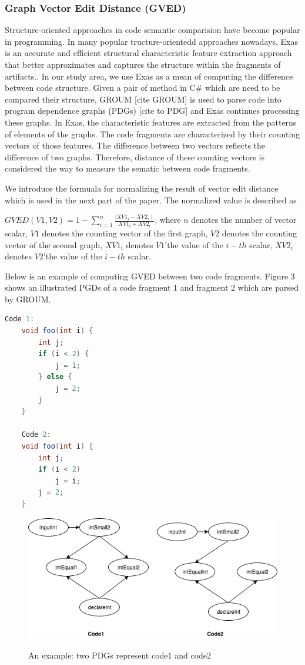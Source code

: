 \subsubsection{\textbf{Graph Vector Edit Distance (GVED)}} 
Structure-oriented approaches in code semantic comparision have become popular in programming. In many popular tructure-orientedd approaches nowadays, Exas is an accurate and efficient structural characteristic feature extraction approach that better approximates and captures the structure within the fragments of artifacts.\cite{Accurate and Efficient Structural Characteristic Feature Extraction for Clone Detection}.
In our study area, we use Exas as a mean of computing the difference between code structure. Given a pair of method in C\# which are need to be compared their structure, GROUM [cite GROUM] is used to parse code into program dependence graphs (PDGs) [cite to PDG] and Exas continues processing these graphs. In Exas, the characteristic features are extracted from the patterns of elements of the graphs. The code fragments are characterized by their counting vectors of those features. The difference between two vectors reflects the difference of two graphs.  Therefore, distance of these counting vectors is considered the way to measure the sematic between code fragments.

We introduce the formuala for normalizing the result of vector edit distance which is used in the next part of the paper. The normalized value is described as

$GVED(V1, V2) = 1 - \sum_{i=1}^{n} \frac{ \mid XV1_i - XV2_i \mid}{XV1_i + XV2_i}$, 
where $n$ denotes the number of vector scalar, $V1$ denotes the counting vector of the first graph, $V2$ denotes the counting vector of the second graph, $XV1_i$ denotes $V1$\rq the value of the $i-th$ scalar, $XV2_i$ denotes $V2$\rq the value of the $i-th$ scalar.  

Below is an example of computing GVED between two code fragments. Figure 3 shows an illustrated PGDs  of a code fragment 1 and fragment 2 which are parsed by GROUM.
\begin{lstlisting}[language=JAVA]
	Code 1:
	void foo(int i) {
		int j;
		if (i < 2) {
			j = 1;
		} else {
			j = 2;
		}
	}

	Code 2:
	void foo(int i) {
		int j;
		if (i < 2) 
			j = i;	 
		j = 2;
	}
\end{lstlisting}
\begin{figure}[h]
	\caption{An example: two PDGs represent code1 and code2}
	\includegraphics[scale=0.4]{img/Diagram_PDG.png}
	\centering
	\label{fig:PDGs}
\end{figure}